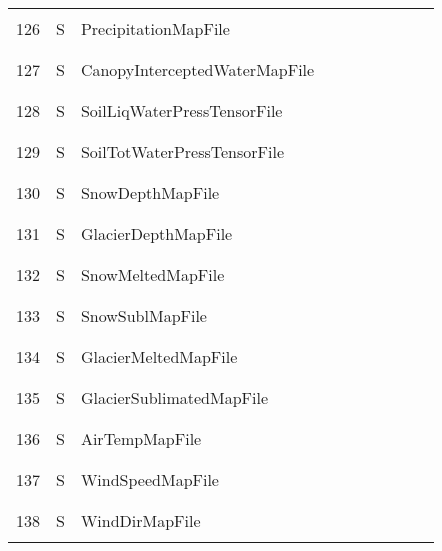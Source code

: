 \begin{longtable}{|c|c|l|c|c|c|c|p{}|c|p{}|}
&&&&&&&&&\\\hline%
&&&&&&&&&\\
126 & S & PrecipitationMapFile & & & & & & & \\
&&&&&&&&&\\\hline%
&&&&&&&&&\\
127 & S & CanopyInterceptedWaterMapFile & & & & & & & \\
&&&&&&&&&\\\hline%
&&&&&&&&&\\
128 & S & SoilLiqWaterPressTensorFile & & & & & & & \\
&&&&&&&&&\\\hline%
&&&&&&&&&\\
129 & S & SoilTotWaterPressTensorFile & & & & & & & \\
&&&&&&&&&\\\hline%
&&&&&&&&&\\
130 & S & SnowDepthMapFile & & & & & & & \\
&&&&&&&&&\\\hline%
&&&&&&&&&\\
131 & S & GlacierDepthMapFile & & & & & & & \\
&&&&&&&&&\\\hline%
&&&&&&&&&\\
132 & S & SnowMeltedMapFile & & & & & & & \\
&&&&&&&&&\\\hline%
&&&&&&&&&\\
133 & S & SnowSublMapFile & & & & & & & \\
&&&&&&&&&\\\hline%
&&&&&&&&&\\
134 & S & GlacierMeltedMapFile & & & & & & & \\
&&&&&&&&&\\\hline%
&&&&&&&&&\\
135 & S & GlacierSublimatedMapFile & & & & & & & \\
&&&&&&&&&\\\hline%
&&&&&&&&&\\
136 & S & AirTempMapFile & & & & & & & \\
&&&&&&&&&\\\hline%
&&&&&&&&&\\
137 & S & WindSpeedMapFile & & & & & & & \\
&&&&&&&&&\\\hline%
&&&&&&&&&\\
138 & S & WindDirMapFile & & & & & & & \\
&&&&&&&&&\\\hline%

\end{longtable}
